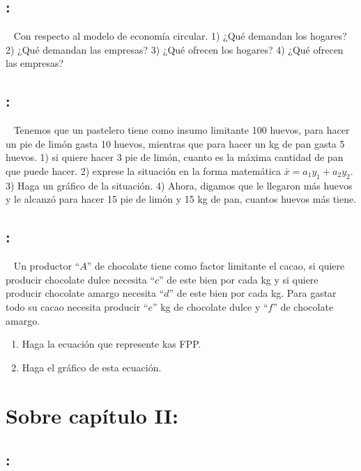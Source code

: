 \documentclass[
  letterpaper,
  DIV=11,
  numbers=noendperiod]{scrreport}
\providecommand{\tightlist}{%
  \setlength{\itemsep}{0pt}\setlength{\parskip}{0pt}}\usepackage{longtable,booktabs,array}
\begin{document}
\hypertarget{section-1}{%
\subsection{:}\label{section-1}}

~ Con respecto al modelo de economía circular. 1) ¿Qué demandan los
hogares? 2) ¿Qué demandan las empresas? 3) ¿Qué ofrecen los hogares? 4)
¿Qué ofrecen las empresas?

\hypertarget{section-2}{%
\subsection{:}\label{section-2}}

~ Tenemos que un pastelero tiene como insumo limitante 100 huevos, para
hacer un pie de limón gasta 10 huevos, mientras que para hacer un kg de
pan gasta 5 huevos. 1) si quiere hacer 3 pie de limón, cuanto es la
máxima cantidad de pan que puede hacer. 2) exprese la situación en la
forma matemática \(\bar x=a_1y_1+a_2y_2\). 3) Haga un gráfico de la
situación. 4) Ahora, digamos que le llegaron más huevos y le alcanzó
para hacer 15 pie de limón y 15 kg de pan, cuantos huevos más tiene.

\hypertarget{section-3}{%
\subsection{:}\label{section-3}}

~ Un productor ``\(A\)'' de chocolate tiene como factor limitante el
cacao, si quiere producir chocolate dulce necesita ``\(c\)'' de este
bien por cada kg y si quiere producir chocolate amargo necesita
``\(d\)'' de este bien por cada kg. Para gastar todo su cacao necesita
producir ``\(e\)'' kg de chocolate dulce y ``\(f\)'' de chocolate
amargo.

\begin{enumerate}
\def\labelenumi{\arabic{enumi})}
\tightlist
\item
  Haga la ecuación que represente kas FPP.
\item
  Haga el gráfico de esta ecuación.
\end{enumerate}

\hypertarget{sobre-capuxedtulo-ii}{%
\section{Sobre capítulo II:}\label{sobre-capuxedtulo-ii}}

\hypertarget{section-4}{%
\subsection{:}\label{section-4}}
\end{document}
